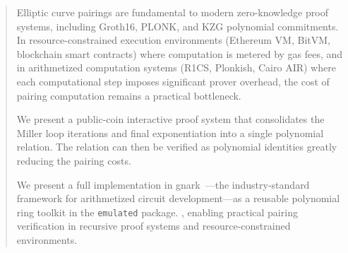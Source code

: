 \begin{abstract}
Elliptic curve pairings are fundamental to modern zero-knowledge proof systems, including Groth16, PLONK, and KZG polynomial commitments. In resource-constrained execution environments (Ethereum VM, BitVM, blockchain smart contracts) where computation is metered by gas fees, and in arithmetized computation systems (R1CS, Plonkish, Cairo AIR) where each computational step imposes significant prover overhead, the cost of pairing computation remains a practical bottleneck.

We present a public-coin interactive proof system that consolidates the Miller loop iterations and final exponentiation into a single polynomial relation. The relation can then be verified as polynomial identities greatly reducing the pairing costs.

We present a full implementation in gnark~\cite{gnark}---the industry-standard framework for arithmetized circuit development---as a reusable polynomial ring toolkit in the \texttt{emulated} package. , enabling practical pairing verification in recursive proof systems and resource-constrained environments.
\end{abstract}
